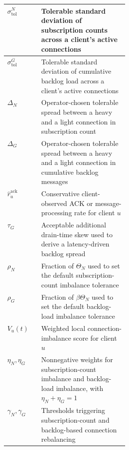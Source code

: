 \begin{longtable}{|>{\raggedright\arraybackslash}p{0.29\linewidth}|>{\raggedright\arraybackslash}p{}|}
			$\sigma^{N}_{\mathrm{tol}}$
			& Tolerable standard deviation of subscription counts across a client's active connections \\ \hline

			$\sigma^{G}_{\mathrm{tol}}$
			& Tolerable standard deviation of cumulative backlog load across a client's active connections \\ \hline

			$\Delta_N$
			& Operator-chosen tolerable spread between a heavy and a light connection in subscription count \\ \hline

			$\Delta_G$
			& Operator-chosen tolerable spread between a heavy and a light connection in cumulative backlog messages \\ \hline

			$\widehat{r}^{\mathrm{ack}}_{u}$
			& Conservative client-observed ACK or message-processing rate for client $u$ \\ \hline

			$\tau_G$
			& Acceptable additional drain-time skew used to derive a latency-driven backlog spread \\ \hline

			$\rho_N$
			& Fraction of $\Theta_N$ used to set the default subscription-count imbalance tolerance \\ \hline

			$\rho_G$
			& Fraction of $\beta\Theta_N$ used to set the default backlog-load imbalance tolerance \\ \hline

			$V_u(t)$
			& Weighted local connection-imbalance score for client $u$ \\ \hline

			$\eta_N,\eta_G$
			& Nonnegative weights for subscription-count imbalance and backlog-load imbalance, with $\eta_N+\eta_G=1$ \\ \hline
			
			$\gamma_N,\gamma_G$ 
			& Thresholds triggering subscription-count and backlog-based connection rebalancing \\ \hline
\end{longtable}
\endgroup
{}
\begingroup
\small
\renewcommand{\arraystretch}{1.12}
\setlength{\tabcolsep}{5pt}
